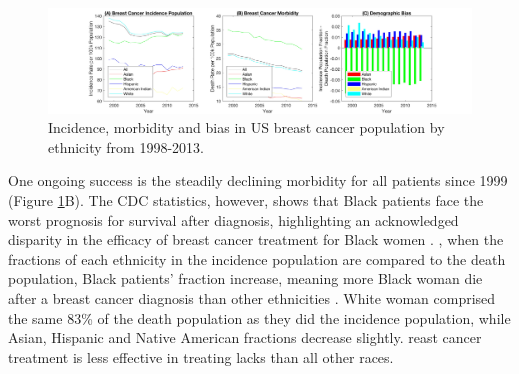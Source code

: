 \documentclass[11pt]{article}
\begin{document}
\begin{figure}[ht!]
  \centering
  \includegraphics[width=1\columnwidth, trim = {20cm 0cm 10cm 0cm}, clip]{Figures/Rationale.jpg}
  \caption{\label{PS1} Incidence, morbidity and bias in US breast cancer population by ethnicity from 1998-2013.}%
\end{figure}

One ongoing success is the steadily declining morbidity for all patients since 1999 (Figure \ref{PS1}B). The CDC statistics, however, shows that Black patients face the worst prognosis for survival after diagnosis, highlighting an acknowledged disparity in the efficacy of breast cancer treatment for Black women \cite{greenlee2000cancer, berkman2014racial}. , when the fractions of each ethnicity in the incidence population are compared to the death population, Black patients' fraction increase, meaning more Black woman die after a breast cancer diagnosis than other ethnicities .  White woman comprised the same 83\% of the death population as they did the incidence population, while Asian, Hispanic and Native American fractions decrease slightly. reast cancer treatment is less effective in treating lacks than all other races. 
\end{document}
